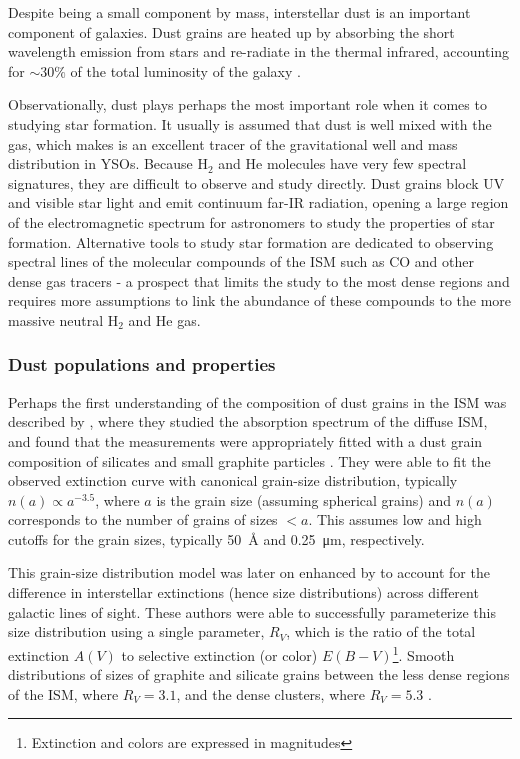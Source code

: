 Despite being a small component by mass, interstellar dust is an important component of galaxies. Dust grains are heated up by absorbing the short wavelength emission from stars and re-radiate in the thermal infrared, accounting for $\sim 30\%$ of the total luminosity of the galaxy \citep{Mathis:1990jk}. 

Observationally, dust plays perhaps the most important role when it comes to studying star formation. It usually is assumed that dust is well mixed with the gas, which makes is an excellent tracer of the gravitational well and mass distribution in YSOs. Because H$_2$ and He molecules have very few spectral signatures, they are difficult to observe and study directly. Dust grains block UV and visible star light and emit continuum far-IR radiation, opening a large region of the electromagnetic spectrum for astronomers to study the properties of star formation. Alternative tools to study star formation are dedicated to observing spectral lines of the molecular compounds of the ISM such as CO and other dense gas tracers - a prospect that limits the study to the most dense regions and requires more assumptions to link the abundance of these compounds to the more massive neutral H$_2$ and He gas.


\subsubsection{Dust populations and properties}


Perhaps the first understanding of the composition of dust grains in the ISM was described by \cite{Mathis:1977hp}, where they studied the absorption spectrum of the diffuse ISM, and found that the measurements were appropriately fitted with a dust grain composition of silicates and small graphite particles \citep{Stecher:1965eq}. They were able to fit the observed extinction curve with canonical grain-size distribution, typically $n(a) \propto a^{-3.5}$, where $a$ is the grain size (assuming spherical grains) and $n(a)$ corresponds to the number of grains of sizes $<a$. This assumes low and high cutoffs for the grain sizes, typically \SI{50}{\angstrom} and \SI{0.25}{\micro\meter}, respectively.

This grain-size distribution model was later on enhanced by \cite{Cardelli:1989dp} to account for the difference in interstellar extinctions (hence size distributions) across different galactic lines of sight. These authors were able to successfully parameterize this size distribution using a single parameter, $R_V$, which is the ratio of the total extinction $A(V)$ to selective extinction (or color) $E(B-V)$\footnote{Extinction and colors are expressed in magnitudes}. Smooth distributions of sizes of graphite and silicate grains between the less dense regions of the ISM, where $R_V = 3.1$, and the dense clusters, where $R_V = 5.3$ \citep{Kim:1994iu}. 

